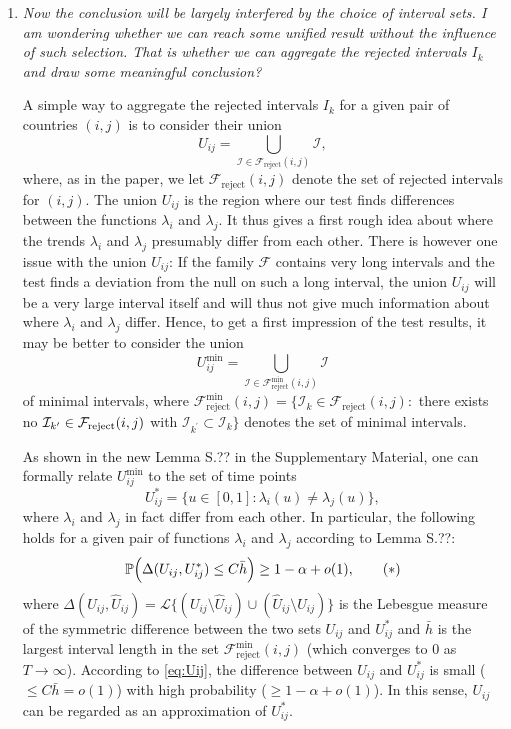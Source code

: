 \documentclass[a4paper,12pt]{article}
\begin{document}
\begin{enumerate}[label=(\arabic*),leftmargin=0.7cm]
\item \textit{Now the conclusion will be largely interfered by the choice of interval sets. I am wondering whether we can reach some unified result without the influence of such selection. That is whether we can aggregate the rejected intervals $I_k$ and draw some meaningful conclusion?}

A simple way to aggregate the rejected intervals $I_k$ for a given pair of countries $(i,j)$ is to consider their union
\[ U_{ij} = \bigcup_{\mathcal{I} \in \mathcal{F}_{\text{reject}}(i,j)} \mathcal{I}, \]
where, as in the paper, we let $\mathcal{F}_{\text{reject}}(i,j)$ denote the set of rejected intervals for $(i,j)$. 
The union $U_{ij}$ is the region where our test finds differences between the functions $\lambda_i$ and $\lambda_j$. It thus gives a first rough idea about where the trends $\lambda_i$ and $\lambda_j$ presumably differ from each other. There is however one issue with the union $U_{ij}$: If the family $\mathcal{F}$ contains very long intervals and the test finds a deviation from the null on such a long interval, the union $U_{ij}$ will be a very large interval itself and will thus not give much information about where $\lambda_i$ and $\lambda_j$ differ. Hence, to get a first impression of the test results, it may be better to consider the union 
\[ U_{ij}^{\min} = \bigcup_{\mathcal{I} \in \mathcal{F}_{\text{reject}}^{\min}(i,j)} \mathcal{I} \]
of minimal intervals, where $\mathcal{F}_{\text{reject}}^{\text{min}}(i,j) = \{ \mathcal{I}_k \in \mathcal{F}_{\text{reject}}(i,j):$  there exists no $\mathcal{I}_{k^\prime} \in \mathcal{F}_{\text{reject}}(i,j)$ with $\mathcal{I}_{k^\prime} \subset \mathcal{I}_k \}$ denotes the set of minimal intervals. %


As shown in the new Lemma S.?? in the Supplementary Material, one can formally relate $U_{ij}^{\min}$ to the set of time points 
\[ U_{ij}^* = \{ u \in [0,1]: \lambda_i(u) \ne \lambda_j(u) \}, \]
where $\lambda_i$ and $\lambda_j$ in fact differ from each other. In particular, the following holds for a given pair of functions $\lambda_i$ and $\lambda_j$ according to Lemma S.??: 
\begin{equation}\label{eq:Uij}
\mathbb{P}  \Big( \Delta(U_{ij}, U_{ij}^*) \le C \bar{h} \Big) \ge 1-\alpha + o(1), \tag{$*$}
\end{equation}
where $\Delta(U_{ij},\hat{U}_{ij}) = \mathcal{L} \{(U_{ij} \setminus \hat{U}_{ij}) \cup (\hat{U}_{ij} \setminus U_{ij})\}$ is the Lebesgue measure of the symmetric difference between the two sets $U_{ij}$ and $U_{ij}^*$ and $\bar{h}$ is the largest interval length in the set $\mathcal{F}_{\text{reject}}^{\text{min}}(i,j)$ (which converges to $0$ as $T \to \infty$). According to \eqref{eq:Uij}, the difference between $U_{ij}$ and $U_{ij}^*$ is small ($\le C\bar{h} = o(1)$) with high probability ($\ge 1 -\alpha + o(1)$). In this sense, $U_{ij}$ can be regarded as an approximation of $U_{ij}^*$. 



\end{enumerate}
\end{document}

